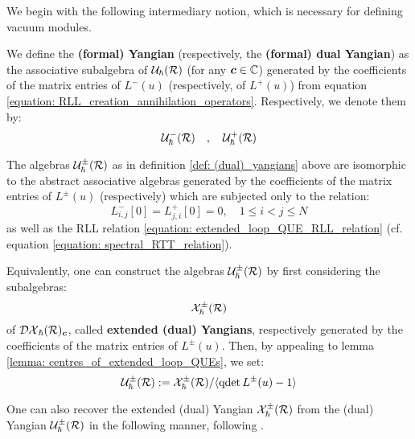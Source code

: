         We begin with the following intermediary notion, which is necessary for defining vacuum modules.
        \begin{definition} \label{def: (dual)_yangians}
            We define the \textbf{(formal) Yangian} (respectively, the \textbf{(formal) dual Yangian}) as the associative subalgebra of $\mathcal{U}_{\hbar}(\mathcal{R})$ (for any $\boldsymbol{c} \in \mathbb{C}$) generated by the coefficients of the matrix entries of $L^-(u)$ (respectively, of $L^+(u)$) from equation \eqref{equation: RLL_creation_annihilation_operators}. Respectively, we denote them by:
                $$\mathcal{U}^-_{\hbar}(\mathcal{R}) \quad, \quad \mathcal{U}^+_{\hbar}(\mathcal{R})$$
        \end{definition}
        \begin{remark} \label{remark: centrally_extended_(dual)_yangians}
            The algebras $\mathcal{U}^{\pm}_{\hbar}(\mathcal{R})$ as in definition \ref{def: (dual)_yangians} above are isomorphic to the abstract associative algebras generated by the coefficients of the matrix entries of $L^{\pm}(u)$ (respectively) which are subjected only to the relation:
                $$L^-_{i, j}[0] = L^+_{j, i}[0] = 0, \quad 1 \leq i < j \leq N$$
            as well as the RLL relation \eqref{equation: extended_loop_QUE_RLL_relation} (cf. equation \eqref{equation: spectral_RTT_relation}).

            Equivalently, one can construct the algebras $\mathcal{U}^{\pm}_{\hbar}(\mathcal{R})$ by first considering the subalgebras:
                $$\mathcal{X}^{\pm}_{\hbar}(\mathcal{R})$$
            of $\mathcal{DX}_{\hbar}(\mathcal{R})_{\boldsymbol{c}}$, called \textbf{extended (dual) Yangians}, respectively generated by the coefficients of the matrix entries of $L^{\pm}(u)$. Then, by appealing to lemma \ref{lemma: centres_of_extended_loop_QUEs}, we set:
                $$\mathcal{U}^{\pm}_{\hbar}(\mathcal{R}) := \mathcal{X}^{\pm}_{\hbar}(\mathcal{R})/\langle \operatorname{qdet} L^{\pm}(u) - 1 \rangle$$

            One can also recover the extended (dual) Yangian $\mathcal{X}^{\pm}_{\hbar}(\mathcal{R})$ from the  (dual) Yangian $\mathcal{U}^{\pm}_{\hbar}(\mathcal{R})$ in the following manner, following \cite[Subsection 3.3]{etingof_kazhdan_quantisation_4}.


\end{remark}

